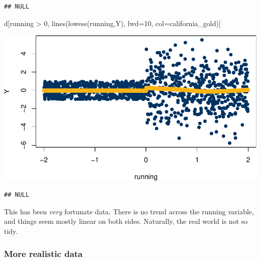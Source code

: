 \documentclass[
]{article}
\newenvironment{Shaded}{\begin{snugshade}}{\end{snugshade}}
\newcommand{\AttributeTok}[1]{\textcolor[rgb]{0.77,0.63,0.00}{#1}}
\newcommand{\DecValTok}[1]{\textcolor[rgb]{0.00,0.00,0.81}{#1}}
\newcommand{\FunctionTok}[1]{\textcolor[rgb]{0.00,0.00,0.00}{#1}}
\newcommand{\NormalTok}[1]{#1}
\newcommand{\SpecialCharTok}[1]{\textcolor[rgb]{0.00,0.00,0.00}{#1}}
\begin{document}
\begin{verbatim}
## NULL
\end{verbatim}

\begin{Shaded}
\begin{Highlighting}[]
\NormalTok{  d[running }\SpecialCharTok{\textgreater{}} \DecValTok{0}\NormalTok{, }\FunctionTok{lines}\NormalTok{(}\FunctionTok{lowess}\NormalTok{(running,Y), }\AttributeTok{lwd=}\DecValTok{10}\NormalTok{, }\AttributeTok{col=}\NormalTok{california\_gold)]}
\end{Highlighting}
\end{Shaded}

\includegraphics{241-live-session_files/figure-latex/second rdd plot-1.pdf}

\begin{verbatim}
## NULL
\end{verbatim}

This has been \emph{very} fortunate data. There is no trend across the running variable, and things seem mostly linear on both sides. Naturally, the real world is not so tidy.

\hypertarget{more-realistic-data}{%
\subsubsection{More realistic data}\label{more-realistic-data}}
\end{document}
